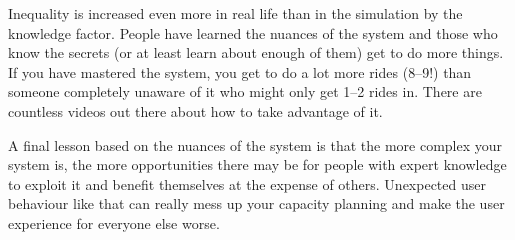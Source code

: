 Inequality is increased even more in real life than in the simulation by the knowledge factor. People have learned the nuances of the system and those who know the secrets (or at least learn about enough of them) get to do more things. If you have mastered the system, you get to do a lot more rides (8--9!) than someone completely unaware of it who might only get 1--2 rides in. There are countless videos out there about how to take advantage of it.

A final lesson based on the nuances of the system is that the more complex your system is, the more opportunities there may be for people with expert knowledge to exploit it and benefit themselves at the expense of others. Unexpected user behaviour like that can really mess up your capacity planning and make the user experience for everyone else worse. 




